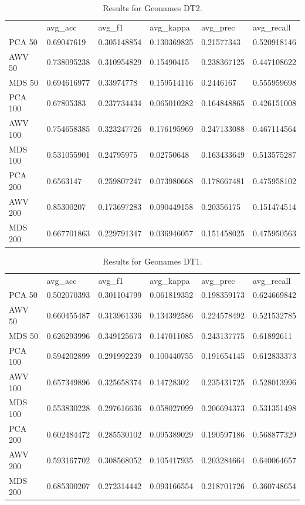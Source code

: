 \begin{table}[]
\begin{tabular}{llllll}
	& avg\_acc    & avg\_f1     & avg\_kappa  & avg\_prec   & avg\_recall \\
	PCA 50  & 0.69047619  & 0.305148854 & 0.130369825 & 0.21577343  & 0.520918146 \\
	AWV 50  & 0.738095238 & 0.310954829 & 0.15490415  & 0.238367125 & 0.447108622 \\
	MDS 50  & 0.694616977 & 0.33974778  & 0.159514116 & 0.2446167   & 0.555959698 \\
	PCA 100 & 0.67805383  & 0.237734434 & 0.065010282 & 0.164848865 & 0.426151008 \\
	AWV 100 & 0.754658385 & 0.323247726 & 0.176195969 & 0.247133088 & 0.467114564 \\
	MDS 100 & 0.531055901 & 0.24795975  & 0.02750648  & 0.163433649 & 0.513575287 \\
	PCA 200 & 0.6563147   & 0.259807247 & 0.073980668 & 0.178667481 & 0.475958102 \\
	AWV 200 & 0.85300207  & 0.173697283 & 0.090449158 & 0.20356175  & 0.151474514 \\
	MDS 200 & 0.667701863 & 0.229791347 & 0.036946057 & 0.151458025 & 0.475950563
\end{tabular}
\caption{Results for Geonames DT2.}
\label{table:Newsgroups}
\end{table}

\begin{table}[]
\begin{tabular}{llllll}
	& avg\_acc    & avg\_f1     & avg\_kappa  & avg\_prec   & avg\_recall \\
	PCA 50  & 0.502070393 & 0.301104799 & 0.061819352 & 0.198359173 & 0.624669842 \\
	AWV 50  & 0.660455487 & 0.313961336 & 0.134392586 & 0.224578492 & 0.521532785 \\
	MDS 50  & 0.626293996 & 0.349125673 & 0.147011085 & 0.243137775 & 0.61892611  \\
	PCA 100 & 0.594202899 & 0.291992239 & 0.100440755 & 0.191654145 & 0.612833373 \\
	AWV 100 & 0.657349896 & 0.325658374 & 0.14728302  & 0.235431725 & 0.528013996 \\
	MDS 100 & 0.553830228 & 0.297616636 & 0.058027099 & 0.206694373 & 0.531351498 \\
	PCA 200 & 0.602484472 & 0.285530102 & 0.095389029 & 0.190597186 & 0.568877329 \\
	AWV 200 & 0.593167702 & 0.308568052 & 0.105417935 & 0.203284664 & 0.640064657 \\
	MDS 200 & 0.685300207 & 0.272314442 & 0.093166554 & 0.218701726 & 0.360748654
\end{tabular}
\caption{Results for Geonames DT1.}
\label{table:Newsgroups}
\end{table}

